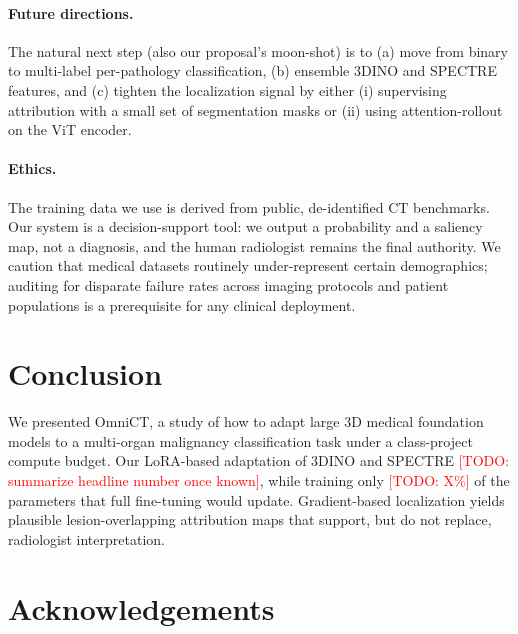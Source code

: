 \documentclass{article}
\newcommand{\TODO}[1]{\textcolor{red}{[TODO: #1]}}
\begin{document}
\paragraph{Future directions.}
The natural next step (also our proposal's moon-shot) is to (a) move
from binary to multi-label per-pathology classification, (b) ensemble
3DINO and SPECTRE features, and (c) tighten the localization signal by
either (i) supervising attribution with a small set of segmentation
masks or (ii) using attention-rollout on the ViT encoder.

\paragraph{Ethics.}
The training data we use is derived from public, de-identified CT
benchmarks. Our system is a decision-support tool: we
output a probability and a saliency map, not a diagnosis, and the human
radiologist remains the final authority. We caution that medical
datasets routinely under-represent certain demographics; auditing for
disparate failure rates across imaging protocols and patient
populations is a prerequisite for any clinical deployment.

\section{Conclusion}

We presented OmniCT, a study of how to adapt large 3D medical
foundation models to a multi-organ malignancy classification task
under a class-project compute budget. Our LoRA-based adaptation of
3DINO and SPECTRE \TODO{summarize headline number once known}, while
training only \TODO{X\%} of the parameters that full fine-tuning would
update. Gradient-based localization yields plausible
lesion-overlapping attribution maps that support, but do not replace,
radiologist interpretation.


\section*{Acknowledgements}
\end{document}

